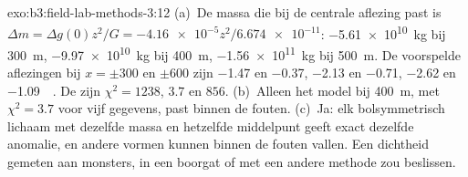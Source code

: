 \begin{solution}{exo:b3:field-lab-methods-3:12}
(a)~De massa die bij de centrale aflezing past is $\Delta m = \Delta g(0)z^2/G
= \num{-4.16e-5}z^2/\num{6.674e-11}$: \qty{-5.61e10}{kg} bij
\qty{300}{m}, \qty{-9.97e10}{kg} bij \qty{400}{m}, \qty{-1.56e11}{kg} bij
\qty{500}{m}. De voorspelde aflezingen bij $x = \pm300$ en $\pm600$ zijn
\num{-1.47} en \num{-0.37}, \num{-2.13} en \num{-0.71}, \num{-2.62}
en \qty{-1.09}{\milli\gal}. De  zijn $\chi^2 = 1238$, $3.7$ en
$856$. (b)~Alleen het model bij \qty{400}{m}, met $\chi^2 = 3.7$ voor vijf
gegevens, past binnen de fouten. (c)~Ja: elk bolsymmetrisch lichaam
met dezelfde massa en hetzelfde middelpunt geeft exact dezelfde anomalie, en andere
vormen kunnen binnen de fouten vallen. Een dichtheid gemeten aan monsters, in een
boorgat of met een andere methode zou beslissen.
\end{solution}

